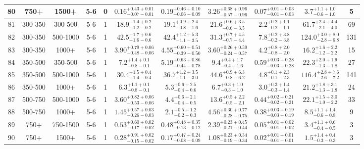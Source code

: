 \documentclass[11pt, oneside]{article}
\begin{document}
\begin{table}
{\begin{tabular}{ |c|c|c|c|c||c|c|c|c||c|c| }
80 & 750+ & 1500+ & 5-6 & 0 & $0.16^{+0.43+0.01}_{-0.07-0.01}$ & $0.19^{+0.46+0.10}_{-0.06-0.09}$ & $3.26^{+0.68+0.96}_{-0.57-0.96}$ & $0.07^{+0.01+0.03}_{-0.01-0.03}$ & $3.7^{+1.1+1.0}_{-0.6-1.0}$ & 5 \\ \hline
81 & 300-350 & 300-500 & 5-6 & 1 & $18.9^{+1.4+0.2}_{-1.2-0.2}$ & $19.1^{+0.9+2.4}_{-0.8-1.6}$ & $21.6^{+0.6+3.5}_{-0.6-3.5}$ & $2.2^{+0.2+1.1}_{-0.2-1.1}$ & $61.7^{+2.4+4.4}_{-2.1-4.0}$ & 69 \\ \hline
82 & 300-350 & 500-1000 & 5-6 & 1 & $42.5^{+1.7+0.6}_{-1.6-0.6}$ & $42.4^{+1.2+5.3}_{-1.1-3.5}$ & $31.3^{+0.7+4.5}_{-0.7-4.4}$ & $7.8^{+0.2+3.8}_{-0.2-3.8}$ & $124.0^{+3.0+8.0}_{-2.8-6.8}$ & 131 \\ \hline
83 & 300-350 & 1000+ & 5-6 & 1 & $3.90^{+0.79+0.06}_{-0.48-0.06}$ & $4.55^{+0.60+0.51}_{-0.39-0.50}$ & $3.60^{+0.26+0.59}_{-0.24-0.57}$ & $4.2^{+0.8+2.0}_{-0.8-2.0}$ & $16.2^{+1.6+2.2}_{-1.2-2.2}$ & 15 \\ \hline
84 & 350-500 & 350-500 & 5-6 & 1 & $7.2^{+1.4+0.1}_{-0.8-0.1}$ & $5.19^{+0.63+0.86}_{-0.44-0.78}$ & $9.4^{+0.4+1.7}_{-0.4-1.6}$ & $0.59^{+0.03+0.28}_{-0.03-0.28}$ & $22.3^{+2.0+1.9}_{-1.3-1.8}$ & 27 \\ \hline
85 & 350-500 & 500-1000 & 5-6 & 1 & $30.4^{+1.5+0.4}_{-1.4-0.4}$ & $36.7^{+1.2+3.5}_{-1.1-3.0}$ & $44.6^{+0.9+6.3}_{-0.8-6.2}$ & $4.8^{+0.1+2.3}_{-0.1-2.3}$ & $116.4^{+2.8+7.6}_{-2.6-7.2}$ & 141 \\ \hline
86 & 350-500 & 1000+ & 5-6 & 1 & $6.3^{+1.1+0.1}_{-0.8-0.1}$ & $5.3^{+0.6+2.5}_{-0.4-0.6}$ & $6.7^{+0.3+1.0}_{-0.3-1.0}$ & $3.0^{+0.3+1.4}_{-0.3-1.4}$ & $21.2^{+1.8+3.1}_{-1.3-1.8}$ & 24 \\ \hline
87 & 500-750 & 500-1000 & 5-6 & 1 & $3.60^{+0.82+0.06}_{-0.53-0.06}$ & $4.4^{+0.6+2.1}_{-0.4-0.5}$ & $13.6^{+0.5+2.2}_{-0.5-2.1}$ & $0.44^{+0.02+0.21}_{-0.02-0.21}$ & $22.1^{+1.5+3.0}_{-1.0-2.2}$ & 33 \\ \hline
88 & 500-750 & 1000+ & 5-6 & 1 & $1.45^{+0.57+0.03}_{-0.26-0.03}$ & $2.1^{+0.5+1.2}_{-0.2-0.3}$ & $4.56^{+0.30+0.77}_{-0.28-0.75}$ & $0.38^{+0.03+0.19}_{-0.03-0.19}$ & $8.5^{+1.1+1.4}_{-0.6-0.8}$ & 9 \\ \hline
89 & 750+ & 750-1500 & 5-6 & 1 & $0.53^{+0.60+0.02}_{-0.17-0.02}$ & $0.48^{+0.48+0.35}_{-0.13-0.12}$ & $2.39^{+0.23+0.45}_{-0.21-0.44}$ & $0.05^{+0.01+0.02}_{-0.01-0.02}$ & $3.4^{+1.1+0.6}_{-0.4-0.5}$ & 3 \\ \hline
90 & 750+ & 1500+ & 5-6 & 1 & $0.28^{+0.91+0.02}_{-0.15-0.02}$ & $0.17^{+0.47+0.24}_{-0.08-0.09}$ & $1.08^{+0.23+0.34}_{-0.19-0.34}$ & $0.02^{+0.01+0.01}_{-0.01-0.01}$ & $1.5^{+1.4+0.4}_{-0.3-0.3}$ & 3 \\ \hline

\end{tabular}}
\end{table}
\end{document}
